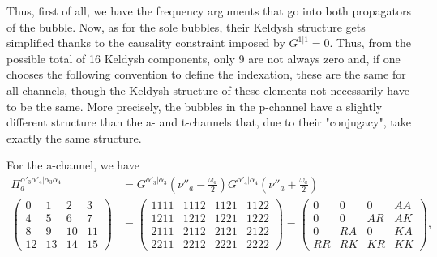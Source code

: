 \documentclass[12pt,a4paper,roman]{article}
\begin{document}
Thus, first of all, we have the frequency arguments that go into both propagators of  the bubble.  Now, as for the sole bubbles, their Keldysh structure gets simplified thanks to the causality constraint imposed by $G^{1|1}=0$. Thus, from the possible total of 16 Keldysh components, only 9 are not always zero and, if one chooses the following convention to define the indexation, these are the same for all channels, though the Keldysh structure of these elements not necessarily have to be the same. More precisely, the bubbles in the p-channel have a slightly different structure than the a- and t-channels that, due to their "conjugacy", take exactly the same structure.

For the a-channel, we have
\begin{align}
\Pi_a^{\alpha'_3\alpha'_4|\alpha_3\alpha_4} &= G^{\alpha'_3|\alpha_3}\left(\nu''_a-\frac{\omega_a}{2}\right)G^{\alpha'_4|\alpha_4}\left(\nu''_a+\frac{\omega_a}{2}\right)\\
\begin{pmatrix}
0  & 1  & 2   & 3\\
4  & 5  & 6   & 7\\
8  & 9  & 10 & 11\\
12& 13&14 & 15
\end{pmatrix} &=
\begin{pmatrix}
1111 & 1112 & 1121 & 1122 \\
1211 & 1212 & 1221 & 1222\\
2111 & 2112 & 2121 & 2122\\
2211& 2212 & 2221 & 2222
\end{pmatrix} = \begin{pmatrix}
0    & 0    & 0    & AA \\
0    & 0    & AR & AK\\
0    & RA & 0    & KA\\
RR & RK & KR & KK
\end{pmatrix},
\end{align}
\end{document}
